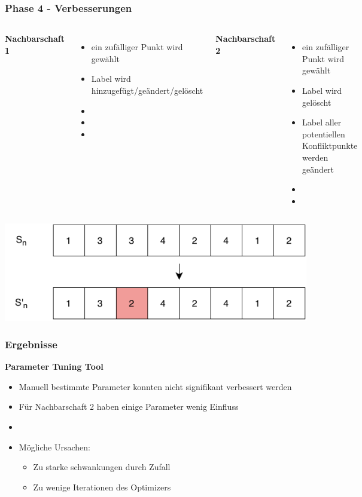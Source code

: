 \documentclass[aspectratio=169]{beamer}
\begin{document}
\begin{frame}
\frametitle{Phase 4 - Verbesserungen}
\begin{columns}[c] %
	
	\textbf{Nachbarschaft 1}
	\begin{itemize}
		\item ein zufälliger Punkt wird gewählt
		\item Label wird hinzugefügt/geändert/gelöscht
		\item[]
		\item[]
		\item[]
	\end{itemize}
	
	\textbf{Nachbarschaft 2}
	\begin{itemize}
		\item ein zufälliger Punkt wird gewählt
		\item Label wird gelöscht
		\item Label aller potentiellen Konfliktpunkte werden geändert
		\item[]
		\item[]
	\end{itemize}
\end{columns}
\centering
	\includegraphics[scale=.6]{sa_representation.pdf}

\end{frame}

\begin{frame}
\frametitle{Ergebnisse}
\textbf{Parameter Tuning Tool}

\begin{itemize}
	\item Manuell bestimmte Parameter konnten nicht signifikant verbessert werden
	\item Für Nachbarschaft 2 haben einige Parameter wenig Einfluss
	\item[]
	\item Mögliche Ursachen: 
	\begin{itemize}
		\item Zu starke schwankungen durch Zufall
		\item Zu wenige Iterationen des Optimizers
	\end{itemize}
\end{itemize}

\end{frame}
\end{document}
